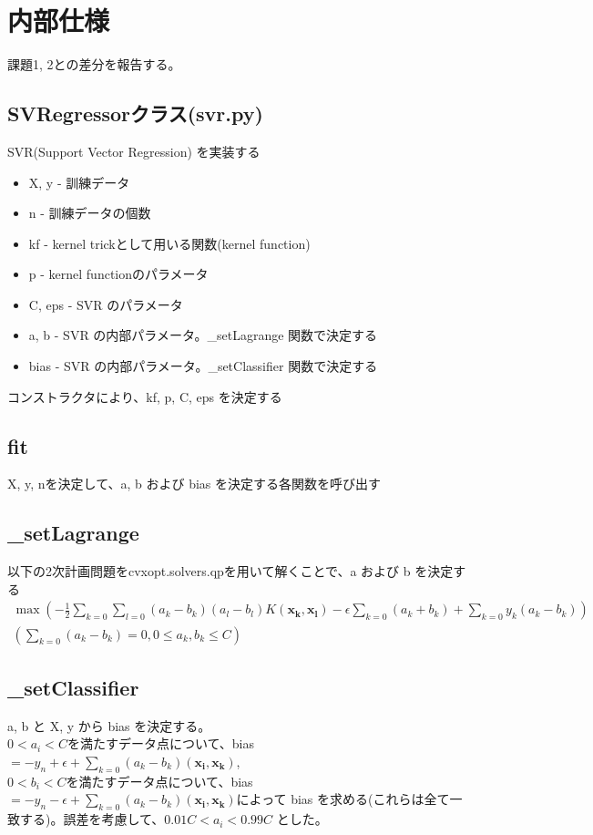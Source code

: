 \documentclass{jsarticle}
\begin{document}
\section{内部仕様}
課題1, 2との差分を報告する。
\subsection*{SVRegressorクラス(svr.py)}
SVR(Support Vector Regression) を実装する
\begin{itemize}
    \item X, y - 訓練データ
    \item n - 訓練データの個数
    \item kf - kernel trickとして用いる関数(kernel function)
    \item p - kernel functionのパラメータ
    \item C, eps - SVR のパラメータ
    \item a, b - SVR の内部パラメータ。\_setLagrange 関数で決定する
    \item bias - SVR の内部パラメータ。\_setClassifier 関数で決定する
\end{itemize}
コンストラクタにより、kf, p, C, eps を決定する
\subsection*{fit}
X, y, nを決定して、a, b および bias を決定する各関数を呼び出す
\subsection*{\_setLagrange}
以下の2次計画問題をcvxopt.solvers.qpを用いて解くことで、a および b を決定する
\begin{eqnarray*}
\max (- \frac{1}{2} \sum_{k=0} \sum_{l=0} (a_k - b_k) (a_l - b_l) K(\bm{x_k}, \bm{x_l})
- \epsilon \sum_{k=0} (a_k + b_k) + \sum_{k=0} y_k (a_k - b_k)) \\
(\sum_{k=0} (a_k - b_k) = 0, 0 \leq a_k, b_k \leq C)
\end{eqnarray*}

\subsection*{\_setClassifier}
a, b と X, y から bias を決定する。 \\
$0 < a_i < C$を満たすデータ点について、bias$ = -y_n + \epsilon + \sum_{k=0} (a_k - b_k) (\bm{x_i}, \bm{x_k})$, \\
$0 < b_i < C$を満たすデータ点について、bias$ = -y_n - \epsilon + \sum_{k=0} (a_k - b_k) (\bm{x_i}, \bm{x_k})$によって
bias を求める(これらは全て一致する)。誤差を考慮して、$0.01C < a_i < 0.99C$ とした。
\end{document}
